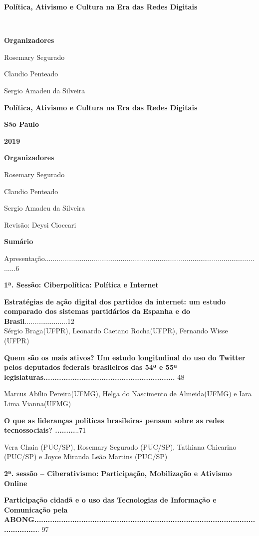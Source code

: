 \textbf{Política, Ativismo e Cultura na Era das Redes Digitais}

\textbf{\\
}

\textbf{Organizadores }

Rosemary Segurado

Claudio Penteado

Sergio Amadeu da Silveira

\textbf{Política, Ativismo e Cultura na Era das Redes Digitais}

\textbf{São Paulo}

\textbf{2019}

\textbf{Organizadores }

Rosemary Segurado

Claudio Penteado

Sergio Amadeu da Silveira

Revisão: Deysi Cioccari

\textbf{Sumário}

Apresentação..................................................................................................................6

\textbf{1ª. Sessão: Ciberpolítica: Política e Internet}

\textbf{Estratégias de ação digital dos partidos da internet: um estudo
comparado dos sistemas partidários da Espanha e do
Brasil}......................12\\
Sérgio Braga(UFPR), Leonardo Caetano Rocha(UFPR), Fernando Wisse\\
(UFPR)

\textbf{Quem são os mais ativos? Um estudo longitudinal do uso do
Twitter pelos deputados federais brasileiros das 54ª e 55ª
legislaturas...........................................................}
48

Marcus Abílio Pereira(UFMG), Helga do Nascimento de Almeida(UFMG) e Iara
Lima Vianna(UFMG)

\textbf{O que as lideranças políticas brasileiras pensam sobre as redes
tecnossociais? .........}..71

Vera Chaia (PUC/SP), Rosemary Segurado (PUC/SP), Tathiana Chicarino
(PUC/SP) e Joyce Miranda Leão Martins (PUC/SP)

\textbf{2ª. sessão -- Ciberativismo: Participação, Mobilização e
Ativismo Online}

\textbf{Participação cidadã e o uso das Tecnologias de Informação e
Comunicação pela
ABONG..................................................................................................................}.
97

